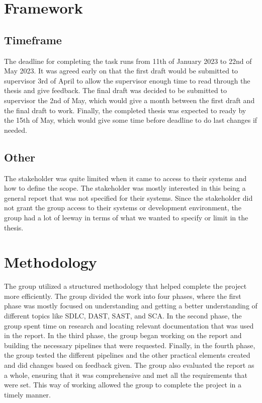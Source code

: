 \newpage
\section{Framework}

\subsection{Timeframe}
The deadline for completing the task runs from 11th of January 2023 to 22nd of May 2023. It was agreed early on that the first draft would be submitted to supervisor 3rd of April to allow the supervisor enough time to read through the thesis and give feedback. The final draft was decided to be submitted to supervisor the 2nd of May, which would give a month between the first draft and the final draft to work. Finally, the completed thesis was expected to ready by the 15th of May, which would give some time before deadline to do last changes if needed. 



\subsection{Other}
The stakeholder was quite limited when it came to access to their systems and how to define the scope. The stakeholder was mostly interested in this being a general report that was not specified for their systems. Since the stakeholder did not grant the group access to their systems or development environment, the group had a lot of leeway in terms of what we wanted to specify or limit in the thesis. 


\section{Methodology}
The group utilized a structured methodology that helped complete the project more efficiently. The group divided the work into four phases, where the first phase was mostly focused on understanding and getting a better understanding of different topics like SDLC, DAST, SAST, and SCA. In the second phase, the group spent time on research and locating relevant documentation that was used in the report. In the third phase, the group began working on the report and building the necessary pipelines that were requested. Finally, in the fourth phase, the group tested the different pipelines and the other practical elements created and did changes based on feedback given. The group also evaluated the report as a whole, ensuring that it was comprehensive and met all the requirements that were set. This way of working allowed the group to complete the project in a timely manner. 


